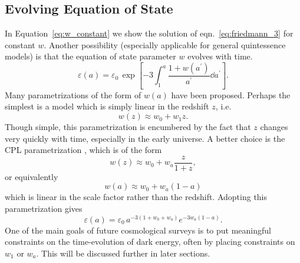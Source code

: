 \subsection{Evolving Equation of State}
In Equation~\ref{eq:w_constant} we show the solution of
eqn.~\ref{eq:friedmann_3} for constant $w$.  Another possibility
(especially applicable for general quintessence models) is that
the equation of state parameter $w$ evolves with time.
\begin{equation}
  \label{eq:w_general}
  \varepsilon(a) = \varepsilon_0\, \exp\left[-3\int_1^a
    \frac{1 + w(a^\prime)}{a^\prime}\dd a^\prime\right].
\end{equation}
Many parametrizations of the form of $w(a)$ have been proposed.  Perhaps
the simplest is a model which is simply linear in the redshift $z$, i.e.
\begin{equation}
  w(z) \approx w_0 + w_1 z.
\end{equation}
Though simple, this parametrization is encumbered by the fact that $z$ changes
very quickly with time, especially in the early universe.  A better 
choice is the CPL parametrization \citep{Chevallier01, Linder03a}, which is
of the form
\begin{equation}
  w(z) \approx w_0 + w_a\frac{z}{1 + z},
\end{equation}
or equivalently
\begin{equation}
  w(a) \approx w_0 + w_a(1 - a)
\end{equation}
which is linear in the scale factor rather than the redshift.  Adopting this
parametrization gives
\begin{equation}
  \label{eq:w_first_order}
  \varepsilon(a) = \varepsilon_0\, a^{-3(1 + w_0 + w_a)}e^{-3w_a(1-a)}.
\end{equation}
One of the main goals of future cosmological surveys is to put meaningful
constraints on the time-evolution of dark energy, often by placing constraints
on $w_1$ or $w_a$.  This will be discussed further in later sections.

